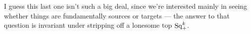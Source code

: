 \documentclass[10pt]{article}
\newcommand{\SqShift}{\Sq_{\smash{+}}}
\newcommand{\Sq}{\mathrm{Sq}}
\begin{document}
\begin{conjectured differentials}
I guess this last one isn't such a big deal, since we're interested mainly in seeing whether things are fundamentally sources or targets --- the answer to that question is invariant under stripping off a lonesome top $\SqShift^{k}$.


\end{conjectured differentials}
\end{document}
